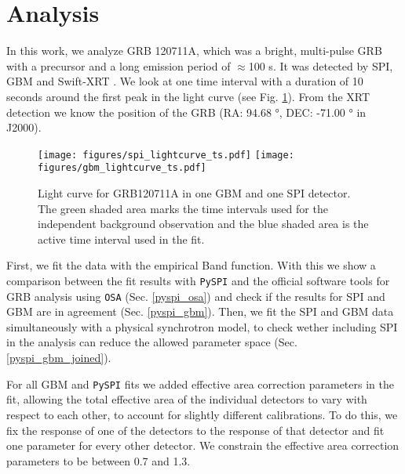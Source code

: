 \documentclass[twocolumn]{aa}
\begin{document}
\section{Analysis}
\label{analysis}
In this work, we analyze GRB 120711A, which was a bright, multi-pulse GRB with a precursor and a long emission period of $\approx$100 s. It was detected by SPI, GBM and Swift-XRT \citep{GCN_integral, GCN_gbm, GCN_swift}. We look at one time interval with a duration of 10 seconds around the first peak in the light curve (see Fig. \ref{fig:time_selection}). From the XRT detection we know the position of the GRB (RA: 94.68 °, DEC: -71.00 ° in J2000).

\begin{figure}
  \begin{centering}
    \texttt{[image: figures/spi\_lightcurve\_ts.pdf]}
    \texttt{[image: figures/gbm\_lightcurve\_ts.pdf]}
    \caption{Light curve for GRB120711A in one GBM and one SPI detector. The green shaded area marks the time intervals used for the independent background observation and the blue shaded area is the active time interval used in the fit.}
    \label{fig:time_selection}
  \end{centering}
\end{figure}

First, we fit the data with the empirical Band function. With this we show a comparison between the fit results with {\tt PySPI} and the official software tools for GRB analysis using {\tt OSA} (Sec. \ref{pyspi_osa}) and check if the results for SPI and GBM are in agreement (Sec. \ref{pyspi_gbm}). Then, we fit the SPI and GBM data simultaneously with a physical synchrotron model, to check wether including SPI in the analysis can reduce the allowed parameter space (Sec. \ref{pyspi_gbm_joined}).

For all GBM and {\tt PySPI} fits we added effective area correction parameters in the fit, allowing the total effective area of the individual detectors to vary with respect to each other, to account for slightly different calibrations. To do this, we fix the response of one of the detectors to the response of that detector and fit one parameter for every other detector. We constrain the effective area correction parameters to be between 0.7 and 1.3.
\end{document}
